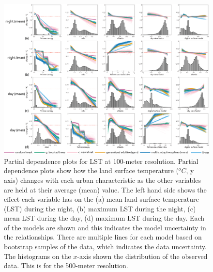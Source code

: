 \documentclass[final,3p,times,twocolumn,sort&compress]{elsarticle}
\begin{document}
\begin{figure}
    \centering
    \includegraphics[width=\linewidth]{fig/report/pdp_100.png}
    \caption[Partial dependence plots for LST at 100-meter resolution]{
    Partial dependence plots for LST at 100-meter resolution.
    Partial dependence plots show how the land surface temperature ($^oC$, y axis) changes with each urban characteristic as the other variables are held at their average (mean) value. 
    The left hand side shows the effect each variable has on the (a) mean land surface temperature (LST) during the night, (b) maximum LST during the night, (c) mean LST during the day, (d) maximum LST during the day. 
    Each of the models are shown and this indicates the model uncertainty in the relationships.
    There are multiple lines for each model based on bootstrap samples of the data, which indicates the data uncertainty.
    The histograms on the $x$-axis shown the distribution of the observed data.
    This is for the 500-meter resolution.
    }
    \label{fig:pdp_100}
\end{figure}
\end{document}
